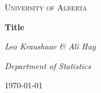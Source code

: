 \documentclass{article}
\begin{document}
\onehalfspacing

\begin{titlepage}
    \centering
    \vfill
    \vspace{3cm}
    {\scshape\LARGE University of Alberta \par}
    \vspace{5cm}
    {\huge\bfseries Title \par}
    \vspace{1cm}
    {\Large\itshape Leo Kraushaar \& Ali Hay\par}
    \vfill
    \vspace{12cm}
    {\Large\itshape Department of Statistics \par}
    \vspace{0.5cm}
    {\large \today\par}
\end{titlepage}
\pagebreak


 
\end{document}
